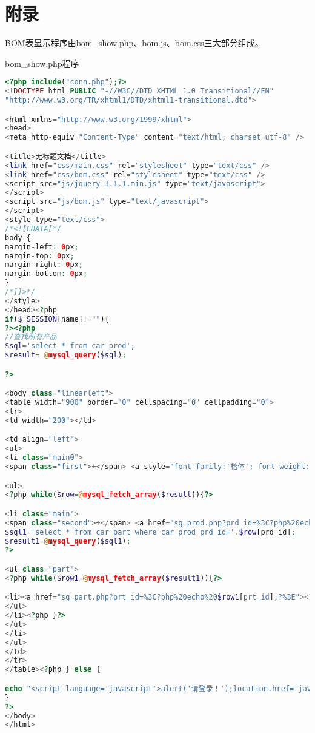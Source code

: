 \newpage
\section*{附录}
\appendix
BOM表显示程序由bom\_show.php、bom.js、bom.css三大部分组成。

bom\_show.php程序
\begin{lstlisting}[language=PHP]
<?php include("conn.php");?>
<!DOCTYPE html PUBLIC "-//W3C//DTD XHTML 1.0 Transitional//EN"
"http://www.w3.org/TR/xhtml1/DTD/xhtml1-transitional.dtd">

<html xmlns="http://www.w3.org/1999/xhtml">
<head>
<meta http-equiv="Content-Type" content="text/html; charset=utf-8" />

<title>无标题文档</title>
<link href="css/main.css" rel="stylesheet" type="text/css" />
<link href="css/bom.css" rel="stylesheet" type="text/css" />
<script src="js/jquery-3.1.1.min.js" type="text/javascript">
</script>
<script src="js/bom.js" type="text/javascript">
</script>
<style type="text/css">
/*<![CDATA[*/
body {
margin-left: 0px;
margin-top: 0px;
margin-right: 0px;
margin-bottom: 0px;
}
/*]]>*/
</style>
</head><?php 
if($_SESSION[name]!=""){
?><?php 
//查找所有产品
$sql='select * from car_prod';
$result= @mysql_query($sql);

?>

<body class="linearleft">
<table width="900" border="0" cellspacing="0" cellpadding="0">
<tr>
<td width="200"></td>

<td align="left">
<ul>
<li class="main0">
<span class="first">+</span> <a style="font-family:'楷体'; font-weight:bolder">车型及其零件</a>

<ul>
<?php while($row=@mysql_fetch_array($result)){?>

<li class="main">
<span class="second">+</span> <a href="sg_prod.php?prd_id=%3C?php%20echo%20$row[prd_id];?%3E"><?php echo $row[prd_name];?></a> <?php 
$sql1='select * from car_part where car_prod_prd_id='.$row[prd_id];
$result1=@mysql_query($sql1);
?>

<ul class="part">
<?php while($row1=@mysql_fetch_array($result1)){?>

<li><a href="sg_part.php?prt_id=%3C?php%20echo%20$row1[prt_id];?%3E"><?php echo $row1[prt_name];?></a></li><?php }?>
</ul>
</li><?php }?>
</ul>
</li>
</ul>
</td>
</tr>
</table><?php } else {

echo "<script language='javascript'>alert('请登录！');location.href='javascript:history.go(-1)';</script>";     
}
?>
</body>
</html>
\end{lstlisting}

